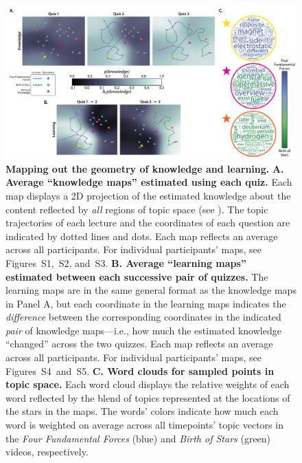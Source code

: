 \documentclass[10pt]{article}
\newcommand{\individualKnowledgeMapsA}{S1}
\newcommand{\individualKnowledgeMapsB}{S2}
\newcommand{\individualKnowledgeMapsC}{S3}
\newcommand{\individualLearningMapsA}{S4}
\newcommand{\individualLearningMapsB}{S5}
\begin{document}
\begin{figure}[tp]
    \centering
    \includegraphics[width=\textwidth]{figs/knowledge_and_learning_maps}

    \caption{\textbf{Mapping out the geometry of knowledge and learning.}
    \textbf{A. Average ``knowledge maps'' estimated using each quiz.} Each map
    displays a 2D projection of the estimated knowledge about the content
    reflected by \textit{all} regions of topic space (see 
    \textit{}). The topic trajectories of each
    lecture and the coordinates of each question are indicated by dotted lines
    and dots. Each map reflects an average across all participants. For
    individual participants' maps, see
    Figures~\individualKnowledgeMapsA,~\individualKnowledgeMapsB,
    and~\individualKnowledgeMapsC. \textbf{B. Average ``learning maps''
    estimated between each successive pair of quizzes.} The learning maps are
    in the same general format as the knowledge maps in Panel A, but each
    coordinate in the learning maps indicates the \textit{difference} between
    the corresponding coordinates in the indicated \textit{pair} of knowledge
    maps---i.e., how much the estimated knowledge ``changed'' across the two
    quizzes. Each map reflects an average across all participants. For
    individual participants' maps, see
    Figures~\individualLearningMapsA~and~\individualLearningMapsB. \textbf{C.
    Word clouds for sampled points in topic space.} Each word cloud displays
    the relative weights of each word reflected by the blend of topics
    represented at the locations of the stars in the maps. The words' colors
    indicate how much each word is weighted on average across all timepoints'
    topic vectors in the \textit{Four Fundamental Forces} (blue) and
    \textit{Birth of Stars} (green) videos, respectively.}

    \label{fig:knowledge-maps}
    \end{figure}
\end{document}

